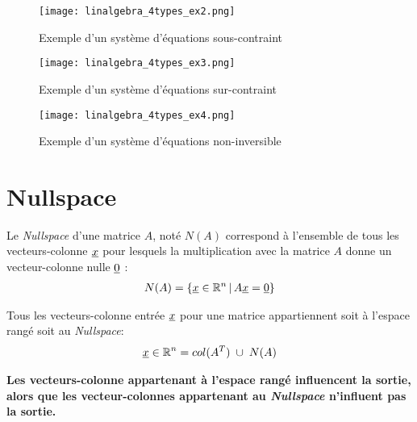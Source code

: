 \begin{figure}[htp]
	\centering
	\texttt{[image: linalgebra\_4types\_ex2.png]}
	\caption{Exemple d'un système d'équations sous-contraint}
	\label{fig:rmn_ex2}
\end{figure}

\begin{figure}[htp]
	\centering
	\texttt{[image: linalgebra\_4types\_ex3.png]}
	\caption{Exemple d'un système d'équations sur-contraint}
	\label{fig:rmn_ex3}
\end{figure}

\begin{figure}[htp]
	\centering
	\texttt{[image: linalgebra\_4types\_ex4.png]}
	\caption{Exemple d'un système d'équations non-inversible}
	\label{fig:rmn_ex4}
\end{figure}


\newpage
\section{Nullspace}
\label{sec:nullspace}

Le \textit{Nullspace} d'une matrice $A$, noté $N(A)$ correspond à l'ensemble de tous les vecteurs-colonne $\underline{x}$ pour lesquels la multiplication avec la matrice $A$ donne un vecteur-colonne nulle $\underline{0}$ :
\begin{align}
	N(A) = \left\{ \underline{x} \in \mathbb{R}^n \,|\, A\underline{x} = \underline{0} \right\}
\end{align}

Tous les vecteurs-colonne entrée $\underline{x}$ pour une matrice appartiennent soit à l'espace rangé soit au \textit{Nullspace}:
\begin{align}
	\col{x} \in \re^n = col(A^T) \; \cup \; N(A) %
\end{align}

\textbf{Les vecteurs-colonne appartenant à l'espace rangé influencent la sortie, alors que les vecteur-colonnes appartenant au \textit{Nullspace} n'influent pas la sortie.}

